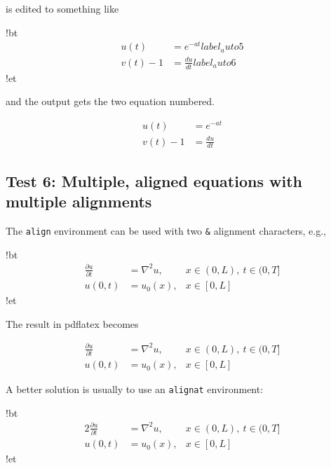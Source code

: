 \documentclass[%
oneside,                 %
final,                   %
10pt]{article}
\begin{document}
\elatexcod

is edited to something like










\blatexcod
!bt
\begin{align}
u(t)&=e^{-at}
label{_auto5}\\ 
v(t) - 1 &= \frac{du}{dt}
label{_auto6}
\end{align}
!et

\elatexcod

and the output gets the two equation numbered.

\begin{align}
u(t)&=e^{-at}\\ 
v(t) - 1 &= \frac{du}{dt}
\end{align}

\subsection{Test 6: Multiple, aligned equations with multiple alignments}

The \texttt{align} environment can be used with two \Verb!&! alignment characters, e.g.,









\blatexcod
!bt
\begin{align}
\frac{\partial u}{\partial t} &= \nabla^2 u, & x\in (0,L),
\ t\in (0,T]\\ 
u(0,t) &= u_0(x), & x\in [0,L]
\end{align}
!et

\elatexcod

The result in pdflatex becomes

\begin{align}
\frac{\partial u}{\partial t} &= \nabla^2 u, & x\in (0,L),
\ t\in (0,T]\\ 
u(0,t) &= u_0(x), & x\in [0,L]
\end{align}

A better solution is usually to use an \texttt{alignat} environment:









\blatexcod
!bt
\begin{alignat}{2}
\frac{\partial u}{\partial t} &= \nabla^2 u, & x\in (0,L),
\ t\in (0,T]\\ 
u(0,t) &= u_0(x), & x\in [0,L]
\end{alignat}
!et
\end{document}
